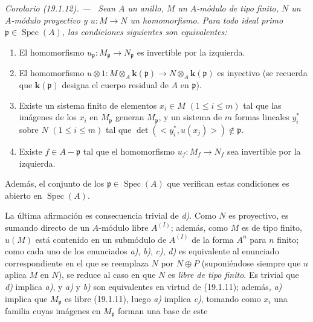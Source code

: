\documentclass[10pt,oneside]{book}
\makeatletter
\newcommand{\setmanualcurrentlabel}[1]{\def\@currentlabel{#1}}
\newcommand{\oldpage}[2][]{%
  \setcounter{footnote}{0}%
  \marginpar{\scriptsize\textbf{#1}~|~#2}\ignorespaces}
\newenvironment{corollary}[1][]{%
  \setmanualcurrentlabel{#1}\par\medskip\noindent\itshape Corolario (#1). ---\ }{\par}
\providecommand{\setmin}{-}%
\makeatother
\begin{document}
\begin{corollary}[19.1.12]
\label{0.19.1.12-es}
Sean $A$ un anillo, $M$ un $A$-módulo de tipo finito, $N$ un $A$-módulo
proyectivo y $u:M\to N$ un homomorfismo. Para todo ideal primo
$\mathfrak p\in\operatorname{Spec}(A)$, las condiciones siguientes son
equivalentes:
\begin{enumerate}
  \item[\textup{a)}] El homomorfismo
  $u_{\mathfrak p}:M_{\mathfrak p}\to N_{\mathfrak p}$ es invertible por la
  izquierda.
  \item[\textup{b)}] El homomorfismo
  $u\otimes1:M\otimes_A\boldsymbol k(\mathfrak p)\to N\otimes_A\boldsymbol k(\mathfrak p)$ es
  inyectivo \textup{(se recuerda que $\boldsymbol k(\mathfrak p)$ designa el cuerpo residual de $A$
  en $\mathfrak p$)}.
  \item[\textup{c)}] Existe un sistema finito de elementos $x_i\in M$
  $(1\leq i\leq m)$ tal que las imágenes de los $x_i$ en $M_{\mathfrak p}$
  generan $M_{\mathfrak p}$, y un sistema de $m$ formas lineales
  $y_i^*$ sobre $N$ $(1\leq i\leq m)$ tal que
  $\det(\mathopen{<}y_i^*,u(x_j)\mathclose{>})\notin\mathfrak p$.
  \item[\textup{d)}] Existe $f\in A\setmin\mathfrak p$ tal que el homomorfismo
  $u_f:M_f\to N_f$ sea invertible por la izquierda.
\end{enumerate}
Además, el conjunto de los $\mathfrak p\in\operatorname{Spec}(A)$ que verifican
estas condiciones es abierto en $\operatorname{Spec}(A)$.
\end{corollary}

La última afirmación es consecuencia trivial de \emph{d)}. Como $N$ es proyectivo, es
sumando directo de un $A$-módulo libre $A^{(I)}$; además, como $M$ es de tipo
finito, $u(M)$ está contenido en un submódulo de $A^{(I)}$ de la forma $A^n$
para $n$ finito; como cada uno de los enunciados \emph{a)}, \emph{b)}, \emph{c)}, \emph{d)} es equivalente
al enunciado correspondiente en el que se reemplaza $N$ por $N\oplus P$
(suponiéndose siempre que $u$ aplica $M$ en $N$), se reduce al caso en que $N$
es \emph{libre de tipo finito}. Es trivial que \emph{d)} implica \emph{a)}, y \emph{a)} y \emph{b)} son
equivalentes en virtud de (19.1.11); además, \emph{a)} implica que
$M_{\mathfrak p}$ es libre (19.1.11), luego \emph{a)} implica \emph{c)}, tomando como $x_i$
una familia cuyas imágenes en $M_{\mathfrak p}$ forman una base de este

\oldpage[0\textsubscript{IV-1}]{77}
\end{document}
